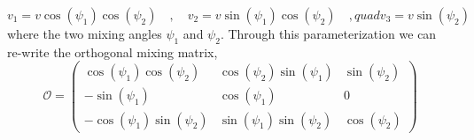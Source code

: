 \begin{equation}
v_1 = v \cos(\psi_1) \cos(\psi_2) \quad , \quad v_2 = v \sin(\psi_1) \cos(\psi_2) \quad , quad v_3 = v \sin(\psi_2)
\end{equation}
%
where the two mixing angles $\psi_1$ and $\psi_2$. 
%
Through this parameterization we can re-write the orthogonal mixing matrix, 
%
\begin{equation}
\label{eq:3HDM_Orthg}
\mathcal{O} = 
\begin{pmatrix}
\cos(\psi_1) \cos(\psi_2) & \cos(\psi_2) \sin(\psi_1) & \sin(\psi_2) \\ 
- \sin(\psi_1) & \cos(\psi_1) & 0 \\ 
- \cos(\psi_1) \sin(\psi_2) & \sin(\psi_1) \sin(\psi_2) & \cos(\psi_2)
\end{pmatrix}
\end{equation}

%
%

%
%
%
%

%
%
%

